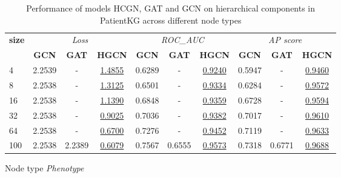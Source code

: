\begin{table}
    \begin{subtable}[t]{\textwidth}
        \centering
        \begin{tabular}{l|ccc|ccc|ccc}   
        \toprule
            \multirow{2}{*}{\textbf{size}} & \multicolumn{3}{c}{\textit{Loss}} & \multicolumn{3}{c}{\textit{ROC\_AUC}} & \multicolumn{3}{c}{\textit{AP score}} \\
            & \textbf{GCN} & \textbf{GAT} & \textbf{HGCN} & \textbf{GCN} & \textbf{GAT} & \textbf{HGCN} & \textbf{GCN} & \textbf{GAT} & \textbf{HGCN} \\
            \midrule
            4 & 2.2539 & - & \underline{1.4855} & 0.6289 & - & \underline{0.9240} & 0.5947 & - & \underline{0.9460} \\
            8 & 2.2538 & - & \underline{1.3125} & 0.6501 & - & \underline{0.9334} & 0.6284 & - & \underline{0.9572} \\
            16 & 2.2538 & - & \underline{1.1390} & 0.6848 & - & \underline{0.9359} & 0.6728 & - & \underline{0.9594} \\
            32 & 2.2538 & - & \underline{0.9025} & 0.7036 & - & \underline{0.9382} & 0.7017 & - & \underline{0.9610} \\
            64 & 2.2538 & - & \underline{0.6700} & 0.7276 & - & \underline{0.9452} & 0.7119 & - & \underline{0.9633} \\
            100 & 2.2538 & 2.2389 & \underline{0.6079} & 0.7567 & 0.6555 & \underline{0.9573} & 0.7318 & 0.6771 & \underline{0.9688} \\
            \bottomrule
        \end{tabular}
        \caption{Node type \textit{Phenotype}}
    \end{subtable}
    \label{tab:tabHypPerf}
    \caption{Performance of models HCGN, GAT and GCN on hierarchical components in PatientKG across different node types}
\end{table}
